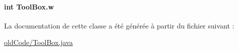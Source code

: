 \paragraph[{w}]{\setlength{\rightskip}{0pt plus 5cm}int Tool\+Box.\+w\hspace{0.3cm}{\ttfamily [private]}}\label{classToolBox_ab44fa7732e3d081f6a771c27c503cb8d}


La documentation de cette classe a été générée à partir du fichier suivant \+:\begin{DoxyCompactItemize}
\item 
\hyperlink{oldCode_2ToolBox_8java}{old\+Code/\+Tool\+Box.\+java}\end{DoxyCompactItemize}
